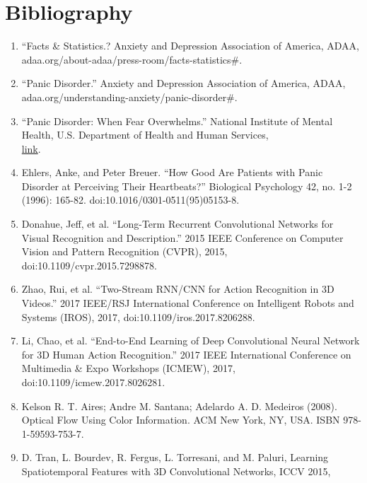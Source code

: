 \documentclass{article}
\begin{document}
\section*{Bibliography}
\begin{enumerate}
\item ``Facts \& Statistics.? Anxiety and Depression Association of America, ADAA, adaa.org/about-adaa/press-room/facts-statistics\#.%
\item ``Panic Disorder.'' Anxiety and Depression Association of America, ADAA, adaa.org/understanding-anxiety/panic-disorder\#.%
\item ``Panic Disorder: When Fear Overwhelms.'' National Institute of Mental Health, U.S. Department of Health and Human Services, \\ \href{www.nimh.nih.gov/health/publications/panic-disorder-when-fear-overwhelms/index.shtml}{link}.
\item  Ehlers, Anke, and Peter Breuer. ``How Good Are Patients with Panic Disorder at Perceiving Their Heartbeats?'' Biological Psychology 42, no. 1-2 (1996): 165-82. doi:10.1016/0301-0511(95)05153-8.
\item Donahue, Jeff, et al. ``Long-Term Recurrent Convolutional Networks for Visual Recognition and Description.'' 2015 IEEE Conference on Computer Vision and Pattern Recognition (CVPR), 2015, doi:10.1109/cvpr.2015.7298878.
\item  Zhao, Rui, et al. ``Two-Stream RNN/CNN for Action Recognition in 3D Videos.'' 2017 IEEE/RSJ International Conference on Intelligent Robots and Systems (IROS), 2017, doi:10.1109/iros.2017.8206288.
\item Li, Chao, et al. ``End-to-End Learning of Deep Convolutional Neural Network for 3D Human Action Recognition.'' 2017 IEEE International Conference on Multimedia \& Expo Workshops (ICMEW), 2017, doi:10.1109/icmew.2017.8026281.
\item Kelson R. T. Aires; Andre M. Santana; Adelardo A. D. Medeiros (2008). Optical Flow Using Color Information. ACM New York, NY, USA. ISBN 978-1-59593-753-7.
\item D. Tran, L. Bourdev, R. Fergus, L. Torresani, and M. Paluri, Learning Spatiotemporal Features with 3D Convolutional Networks, ICCV 2015,
\end{enumerate}
\end{document}

